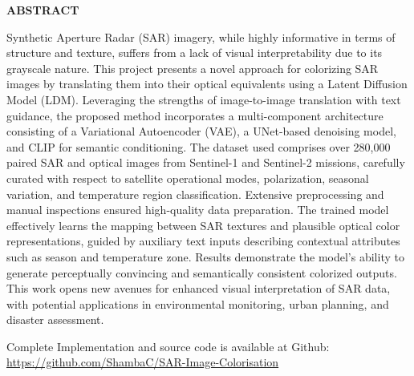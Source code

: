 \begin{center}
    {\large {\bf ABSTRACT}}
\end{center}

Synthetic Aperture Radar (SAR) imagery, while highly informative in terms of structure and texture, suffers from a lack of visual interpretability due to its grayscale nature. This project presents a novel approach for colorizing SAR images by translating them into their optical equivalents using a Latent Diffusion Model (LDM). Leveraging the strengths of image-to-image translation with text guidance, the proposed method incorporates a multi-component architecture consisting of a Variational Autoencoder (VAE), a UNet-based denoising model, and CLIP for semantic conditioning. The dataset used comprises over 280,000 paired SAR and optical images from Sentinel-1 and Sentinel-2 missions, carefully curated with respect to satellite operational modes, polarization, seasonal variation, and temperature region classification. Extensive preprocessing and manual inspections ensured high-quality data preparation. The trained model effectively learns the mapping between SAR textures and plausible optical color representations, guided by auxiliary text inputs describing contextual attributes such as season and temperature zone. Results demonstrate the model’s ability to generate perceptually convincing and semantically consistent colorized outputs. This work opens new avenues for enhanced visual interpretation of SAR data, with potential applications in environmental monitoring, urban planning, and disaster assessment.

Complete Implementation and source code is available at Github: \url{https://github.com/ShambaC/SAR-Image-Colorisation}